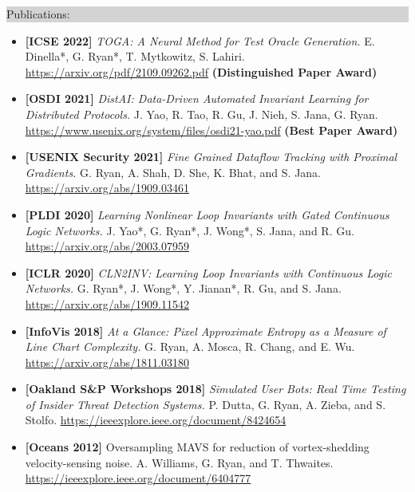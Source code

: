 \documentclass{article} %
\newcommand{\rsection}[1]{
  \hspace{-0.4cm}\vspace{0.1cm}
\colorbox{lightgrey}{
\begin{minipage}{1.07\linewidth}
\vspace{0.22cm}
\fontsize{14pt}{16pt}\selectfont #1
\vspace{0.12cm}
\end{minipage}
}
\vspace*{-0.1cm}
}
\newcommand{\rjob}[2]{
  \hspace*{-0.3cm}
{\fontsize{10pt}{12pt}\selectfont #1} \hfill #2
\vspace*{0.1cm}
\hspace*{-1.2cm}
}
\newenvironment{ritemize}{
\hspace*{-0.8cm}
\begin{minipage}{1.05\linewidth}
\begin{itemize}
}{
\end{itemize}
\end{minipage}
}
\newcommand{\ritem}{
\item[-]
}
\begin{document}

\rsection{Publications:}

\hspace*{-0.1cm}
\begin{minipage}{1.01\linewidth}
\begin{itemize}[label={},itemindent=-2em,leftmargin=2em, parsep=4pt]
  \item {\bf [ICSE 2022]}
    \textit{TOGA: A Neural Method for Test Oracle Generation.}
    E. Dinella*, G. Ryan*, T. Mytkowitz, S. Lahiri. \url{https://arxiv.org/pdf/2109.09262.pdf} \textbf{(Distinguished Paper Award)}
  \item {\bf [OSDI 2021]}
    \textit{DistAI: Data-Driven Automated Invariant Learning for Distributed Protocols.}
    J. Yao, R. Tao, R. Gu, J. Nieh, S. Jana, G. Ryan. \url{https://www.usenix.org/system/files/osdi21-yao.pdf} \textbf{(Best Paper Award)}
  \item {\bf [USENIX Security 2021]}
    \textit{Fine Grained Dataflow Tracking with Proximal Gradients.}
    G. Ryan, A. Shah, D. She, K. Bhat, and S. Jana. \url{https://arxiv.org/abs/1909.03461}
  \item {\bf [PLDI 2020]}
    \textit{Learning Nonlinear Loop Invariants with Gated Continuous Logic Networks.}
    J. Yao*, G. Ryan*, J. Wong*, S. Jana, and R. Gu. \url{https://arxiv.org/abs/2003.07959}
  \item {\bf [ICLR 2020]}
    \textit{CLN2INV: Learning Loop Invariants with Continuous Logic Networks.}
    G. Ryan*, J. Wong*, Y. Jianan*, R. Gu, and S. Jana. \url{https://arxiv.org/abs/1909.11542}
  \item {\bf [InfoVis 2018]}
    \textit{At a Glance: Pixel Approximate Entropy as a Measure of Line Chart Complexity.}
    G. Ryan, A. Mosca, R. Chang, and E. Wu. \url{https://arxiv.org/abs/1811.03180}
  \item  {\bf [Oakland S\&P Workshops 2018]}
    \textit{Simulated User Bots: Real Time Testing of Insider Threat Detection Systems.}
    P. Dutta, G. Ryan, A. Zieba, and S. Stolfo. \url{https://ieeexplore.ieee.org/document/8424654}
  \item  {\bf [Oceans 2012]} \textrm{\fontsize{11pt}{12pt}\selectfont Oversampling MAVS for reduction of vortex-shedding velocity-sensing noise.} A. Williams, G. Ryan, and T. Thwaites. \url{https://ieeexplore.ieee.org/document/6404777}
\end{itemize}
\end{minipage}
\end{document}
